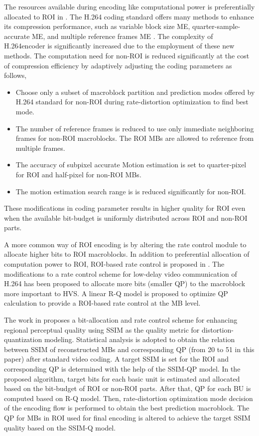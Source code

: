 \documentclass[11pt]{article} %
\begin{document}
 The resources available during encoding like computational power is preferentially allocated to ROI in \cite{ROI-resource-allocation}. The H.264 coding standard offers many methods to enhance its compression performance, such as variable block size ME, quarter-sample-accurate ME, and multiple reference frames ME \cite{h.264-overview}. The complexity of H.264encoder is significantly increased due to the employment of these new methods. The computation need for non-ROI is reduced significantly at the cost of compression efficiency by adaptively adjusting the coding parameters as follows,
\begin{itemize}
	\item Choose only a subset of macroblock partition and prediction modes offered by H.264 standard for non-ROI during rate-distortion optimization to find best mode.
	\item The number of reference frames is reduced to use only immediate neighboring frames for non-ROI macroblocks. The ROI MBs are allowed to reference from multiple frames.
	\item The accuracy of subpixel accurate Motion estimation is set to quarter-pixel for ROI and half-pixel for non-ROI MBs.
	\item The motion estimation search range is is reduced significantly for non-ROI. 
\end{itemize} 
These modifications in coding parameter results in higher quality for ROI even when the available bit-budget is uniformly distributed across ROI and non-ROI parts. 

A more common way of ROI encoding is by altering the rate control module to allocate higher bits to ROI macroblocks. In addition to preferential allocation of computation power to ROI, ROI-based rate control is proposed in \cite{ROI-resource-allocation}. The modifications to a rate control scheme for low-delay video communication of H.264 \cite{ROI-resource-allocation-rate-control} has been proposed to allocate more bits (smaller QP) to the macroblock more important to HVS. A linear R-Q model is proposed to optimize QP calculation to provide a ROI-based rate control at the MB level.

The work in \cite{ROI-bit-allocation-h264} proposes a bit-allocation and rate control scheme for enhancing regional perceptual quality using SSIM as the quality metric for distortion-quantization modeling. Statistical analysis is adopted to obtain the relation between SSIM of reconstructed MBs and corresponding QP (from 20 to 51 in this paper) after standard video coding. A target SSIM is set for the ROI and corresponding QP is determined with the help of the SSIM-QP model. In the proposed algorithm, target bits for each basic unit is estimated and allocated based on the bit-budget of ROI or non-ROI parts. After that, QP for each BU is computed based on R-Q model. Then, rate-distortion optimization mode decision of the encoding flow is performed to obtain the best prediction macroblock. The QP for MBs in ROI used for final encoding is altered to achieve the target SSIM quality based on the SSIM-Q model.
\end{document}

